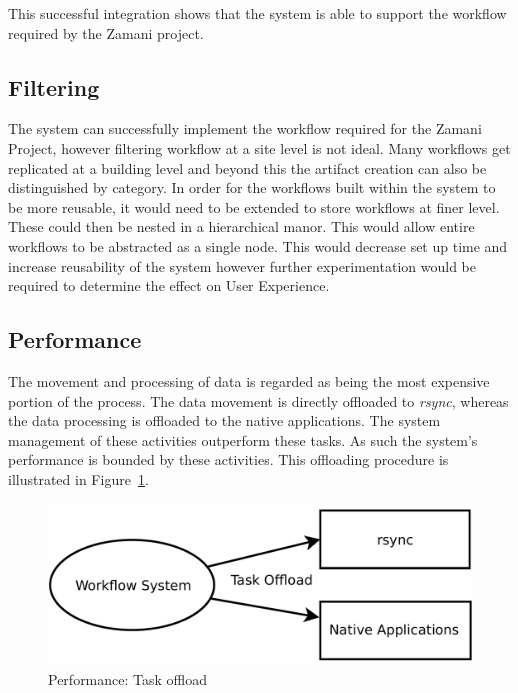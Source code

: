 \documentclass[12pt,a4paper]{report}
\begin{document}
\noindent This successful integration shows that the system is able to support the
workflow required by the Zamani project. 


\subsection{Filtering}
The system can successfully implement the workflow required for the Zamani
Project, however filtering workflow at a site level is not ideal. Many workflows 
get replicated at a building level and beyond this the artifact creation can
also be distinguished by category. In order for the workflows built within the
system to be more reusable, it would need to be extended to store workflows at
finer level. These could then be nested in a hierarchical manor. This would
allow entire workflows to be abstracted as a single node. This would decrease
set up time and increase reusability of the system however further
experimentation would be required to determine the effect on User Experience.

\subsection{Performance}
The movement and processing of data is regarded as being the most expensive
portion of the process. The data movement is directly offloaded to \emph{rsync},
whereas the data processing is offloaded to the native applications. The system 
management of these activities outperform these tasks. As such the system's
performance is bounded by these activities. This offloading procedure is
illustrated in Figure~\ref{eval:offload}.

\begin{figure}[!h]
    \begin{center}
        \includegraphics[scale=0.45]{figures/offload.pdf}
    \end{center}
    \caption{Performance: Task offload}
    \label{eval:offload}
\end{figure}
\end{document}
